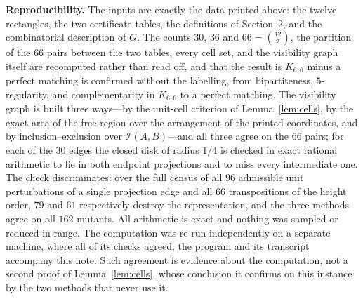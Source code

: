 \documentclass[11pt]{amsart}
\begin{document}
\medskip
\noindent
\textbf{Reproducibility.}
The inputs are exactly the data printed above: the twelve rectangles, the two
certificate tables, the definitions of Section~2, and the combinatorial
description of $G$.  The counts $30$, $36$ and $66=\binom{12}{2}$, the
partition of the $66$ pairs between the two tables, every cell set, and the
visibility graph itself are recomputed rather than read off, and that the
result is $K_{6,6}$ minus a perfect matching is confirmed without the
labelling, from bipartiteness, $5$-regularity, and complementarity in
$K_{6,6}$ to a perfect matching.  The visibility graph is built three
ways---by the unit-cell criterion of Lemma~\ref{lem:cells}, by the exact area
of the free region over the arrangement of the printed coordinates, and by
inclusion--exclusion over $\mathcal I(A,B)$---and all three agree on the $66$
pairs; for each of the $30$ edges the closed disk of radius $1/4$ is checked in
exact rational arithmetic to lie in both endpoint projections and to miss every
intermediate one.  The check discriminates: over the full census of all $96$
admissible unit perturbations of a single projection edge and all $66$
transpositions of the height order, $79$ and $61$ respectively destroy the
representation, and the
three methods agree on all $162$ mutants.  All arithmetic is exact and nothing
was sampled or reduced in range.  The computation was re-run independently on a
separate machine, where all of its checks agreed; the program and its
transcript accompany this note.  Such
agreement is evidence about the computation, not a second proof of
Lemma~\ref{lem:cells}, whose conclusion it confirms on this instance by the two
methods that never use it.
\end{document}
